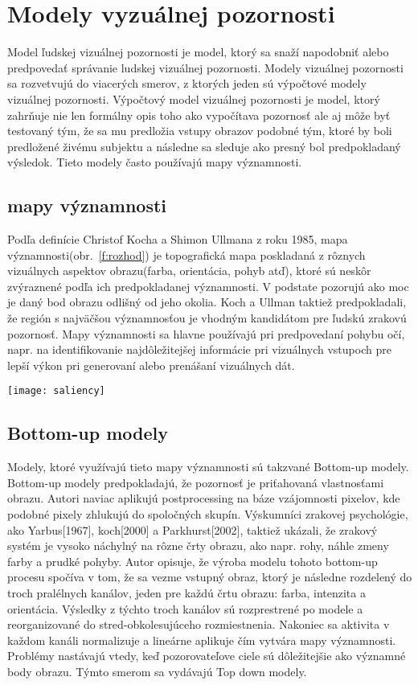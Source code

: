 \documentclass[10pt,twoside,slovak,a4paper]{article}
\begin{document}
\section{Modely vyzuálnej pozornosti} \label{1modely}
Model ľudskej vizuálnej pozornosti je model, ktorý sa snaží napodobniť alebo predpovedať správanie ludskej vizuálnej pozornosti. Modely vizuálnej pozornosti sa rozvetvujú do viacerých smerov, z ktorých jeden sú výpočtové modely vizuálnej pozornosti. Výpočtový model vizuálnej pozornosti je model, ktorý zahrňuje nie len formálny opis toho ako vypočítava pozornosť ale aj môže byť testovaný tým, že sa mu predložia vstupy obrazov podobné tým, ktoré by boli predložené živému subjektu a následne sa sleduje ako presný bol predpokladaný výsledok. Tieto modely často používajú mapy významnosti.%
\subsection{mapy významnosti} \label{ina:nejake}
Podľa definície Christof Kocha a Shimon Ullmana z roku 1985, mapa významnosti(obr.~\ref{f:rozhod}) je topografická mapa poskladaná z rôznych vizuálnych aspektov obrazu(farba, orientácia, pohyb atď), ktoré sú neskôr zvýraznené podľa ich predpokladanej významnosti. V podstate pozorujú ako moc je daný bod obrazu odlišný od jeho okolia. Koch a Ullman taktiež predpokladali, že región s najväčšou významnosťou je vhodným kandidátom pre ľudskú zrakovú pozornosť. Mapy významnosti sa hlavne používajú pri predpovedaní pohybu očí, napr. na identifikovanie najdôležitejšej informácie pri vizuálnych vstupoch pre lepší výkon pri generovaní alebo prenášaní vizuálnych dát.%
\begin{figure*}[tbh]
\centering
\texttt{[image: saliency]}
\caption{Príklad mapy významnosti. Napravo je je vizuálny obraz a naľavo je jeho mapa významnosti.}
\label{f:rozhod}
\end{figure*}
\subsection{Bottom-up modely} \label{ina}
Modely, ktoré využívajú tieto mapy významnosti sú takzvané Bottom-up modely. Bottom-up modely predpokladajú, že pozornosť je priťahovaná vlastnosťami obrazu. Autori\cite{bottom} naviac aplikujú postprocessing na báze vzájomnosti pixelov, kde podobné pixely zhlukujú do spoločných skupín. Výskumníci zrakovej psychológie, ako Yarbus[1967], koch[2000] a Parkhurst[2002], taktiež ukázali, že zrakový systém je vysoko náchylný na rôzne črty obrazu, ako napr. rohy, náhle zmeny farby a prudké pohyby. Autor\cite{saliency:vytvar} opisuje, že výroba modelu tohoto bottom-up procesu spočíva v tom, že sa vezme vstupný obraz, ktorý je následne rozdelený do troch pralélnych kanálov, jeden pre každú črtu obrazu: farba, intenzita a orientácia. Výsledky z týchto troch kanálov sú rozprestrené po modele a reorganizované do stred-obkolesujúceho rozmiestnenia. Nakoniec sa aktivita v každom kanáli normalizuje a lineárne aplikuje čím vytvára mapy významnosti. Problémy nastávajú vtedy, keď pozorovateľove ciele sú dôležitejšie ako významné body obrazu. Týmto smerom sa vydávajú Top down modely.    
\end{document}
